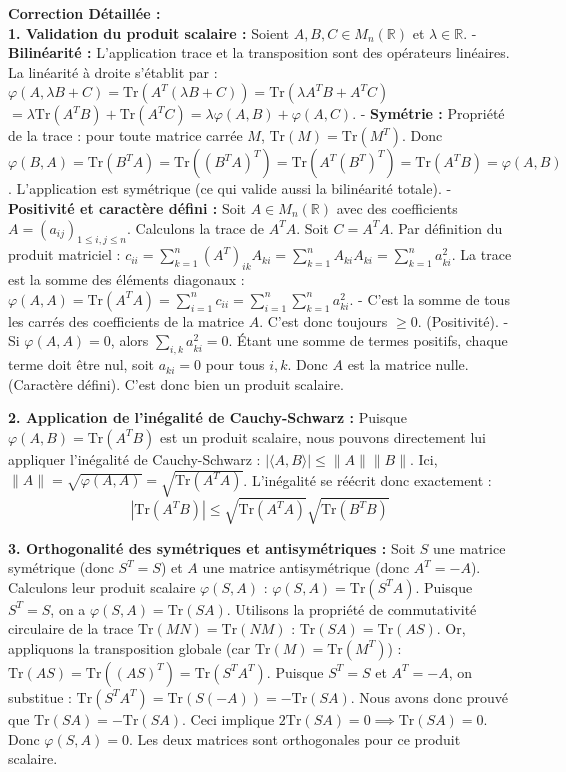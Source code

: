\documentclass[11pt,a4paper]{report}
\begin{document}
\textbf{Correction Détaillée :}\\ \textbf{1. Validation du produit scalaire :}
Soient $A, B, C \in M_n(\mathbb{R})$ et $\lambda \in \mathbb{R}$.
- \textbf{Bilinéarité :} L'application trace et la transposition sont des opérateurs linéaires.
  La linéarité à droite s'établit par :
  $\varphi(A, \lambda B + C) = \text{Tr}(A^T(\lambda B + C)) = \text{Tr}(\lambda A^TB + A^TC)$
  $= \lambda \text{Tr}(A^TB) + \text{Tr}(A^TC) = \lambda \varphi(A, B) + \varphi(A, C)$.
- \textbf{Symétrie :} Propriété de la trace : pour toute matrice carrée $M$, $\text{Tr}(M) = \text{Tr}(M^T)$.
  Donc $\varphi(B, A) = \text{Tr}(B^T A) = \text{Tr}((B^T A)^T) = \text{Tr}(A^T (B^T)^T) = \text{Tr}(A^T B) = \varphi(A, B)$.
  L'application est symétrique (ce qui valide aussi la bilinéarité totale).
- \textbf{Positivité et caractère défini :}
  Soit $A \in M_n(\mathbb{R})$ avec des coefficients $A = (a_{ij})_{1\le i,j \le n}$.
  Calculons la trace de $A^T A$. Soit $C = A^T A$. Par définition du produit matriciel :
  $c_{ii} = \sum_{k=1}^n (A^T)_{ik} A_{ki} = \sum_{k=1}^n A_{ki} A_{ki} = \sum_{k=1}^n a_{ki}^2$.
  La trace est la somme des éléments diagonaux :
  $\varphi(A, A) = \text{Tr}(A^T A) = \sum_{i=1}^n c_{ii} = \sum_{i=1}^n \sum_{k=1}^n a_{ki}^2$.
  - C'est la somme de tous les carrés des coefficients de la matrice $A$. C'est donc toujours $\ge 0$. (Positivité).
  - Si $\varphi(A, A) = 0$, alors $\sum_{i,k} a_{ki}^2 = 0$. Étant une somme de termes positifs, chaque terme doit être nul, soit $a_{ki} = 0$ pour tous $i, k$. Donc $A$ est la matrice nulle. (Caractère défini).
C'est donc bien un produit scalaire.

\textbf{2. Application de l'inégalité de Cauchy-Schwarz :}
Puisque $\varphi(A, B) = \text{Tr}(A^T B)$ est un produit scalaire, nous pouvons directement lui appliquer l'inégalité de Cauchy-Schwarz : $|\langle A, B \rangle| \le \|A\| \|B\|$.
Ici, $\|A\| = \sqrt{\varphi(A, A)} = \sqrt{\text{Tr}(A^T A)}$.
L'inégalité se réécrit donc exactement :
$$|\text{Tr}(A^T B)| \le \sqrt{\text{Tr}(A^T A)} \sqrt{\text{Tr}(B^T B)}$$

\textbf{3. Orthogonalité des symétriques et antisymétriques :}
Soit $S$ une matrice symétrique (donc $S^T = S$) et $A$ une matrice antisymétrique (donc $A^T = -A$).
Calculons leur produit scalaire $\varphi(S, A)$ :
$\varphi(S, A) = \text{Tr}(S^T A)$.
Puisque $S^T = S$, on a $\varphi(S, A) = \text{Tr}(SA)$.
Utilisons la propriété de commutativité circulaire de la trace $\text{Tr}(MN) = \text{Tr}(NM)$ :
$\text{Tr}(SA) = \text{Tr}(AS)$.
Or, appliquons la transposition globale (car $\text{Tr}(M) = \text{Tr}(M^T)$) :
$\text{Tr}(AS) = \text{Tr}((AS)^T) = \text{Tr}(S^T A^T)$.
Puisque $S^T = S$ et $A^T = -A$, on substitue :
$\text{Tr}(S^T A^T) = \text{Tr}(S(-A)) = -\text{Tr}(SA)$.
Nous avons donc prouvé que $\text{Tr}(SA) = -\text{Tr}(SA)$.
Ceci implique $2\text{Tr}(SA) = 0 \implies \text{Tr}(SA) = 0$.
Donc $\varphi(S, A) = 0$. Les deux matrices sont orthogonales pour ce produit scalaire.
\end{document}
